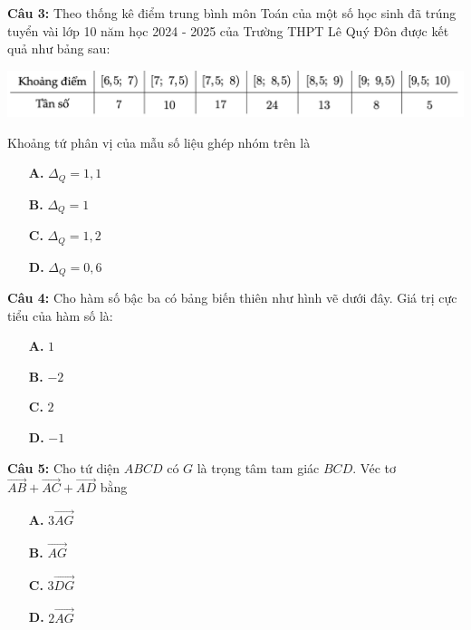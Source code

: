 \documentclass[12pt, a4paper]{article}
\begin{document}
\textbf{Câu 3: } Theo thống kê điểm trung bình môn Toán của một số học sinh đã trúng tuyển vài lớp 10 năm học 2024 - 2025 của Trường THPT Lê Quý Đôn được kết quả như bảng sau:
\vspace{-0.4cm}
	\begin{center}
		\includegraphics[scale=0.75]{../assets/2.png}
	\end{center}
\vspace{-0.8cm}
	Khoảng tứ phân vị của mẫu số liệu ghép nhóm trên là
	\begin{multicols}{4}
		\begin{enumerate}
			\item[\textbf{A.}] $ \Delta _Q = 1,1 $
			\item[\textbf{B.}] $ \Delta _Q = 1 $
			\item[\textbf{C.}] $ \Delta _Q = 1,2 $
			\item[\textbf{D.}] $ \Delta _Q = 0,6 $
		\end{enumerate}
	\end{multicols}
	
\textbf{Câu 4: } Cho hàm số bậc ba có bảng biến thiên như hình vẽ dưới đây. Giá trị cực tiểu của hàm số là:
	\begin{center}
	\end{center}
	\begin{multicols}{4}
		\begin{enumerate}
			\item[\textbf{A.}] $ 1 $
			\item[\textbf{B.}] $ -2 $
			\item[\textbf{C.}] $ 2 $
			\item[\textbf{D.}] $ -1 $
		\end{enumerate}
	\end{multicols}
	
\pagebreak

\textbf{Câu 5: } Cho tứ diện $ ABCD $ có $ G $ là trọng tâm tam giác $ BCD $. Véc tơ $ \overrightarrow{AB} + \overrightarrow{AC} + \overrightarrow{AD} $ bằng
	\begin{multicols}{4}
		\begin{enumerate}
			\item[\textbf{A.}] $ 3\overrightarrow{AG} $
			\item[\textbf{B.}] $ \overrightarrow{AG} $
			\item[\textbf{C.}] $ 3\overrightarrow{DG} $
			\item[\textbf{D.}] $ 2\overrightarrow{AG} $
		\end{enumerate}
	\end{multicols}
	
\end{document}
